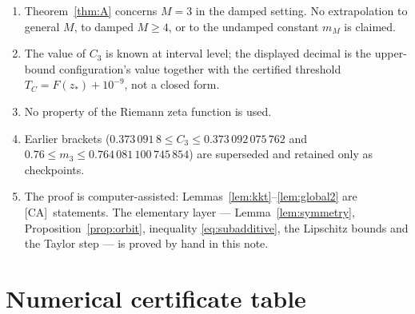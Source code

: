\documentclass[11pt]{article}
\theoremstyle{remark}
\newcommand{\CA}{\textsf{[CA]}}
\begin{document}
\begin{enumerate}
\item Theorem~\ref{thm:A} concerns $M=3$ in the damped setting. No extrapolation to general $M$, to damped
$M\ge4$, or to the undamped constant $m_M$ is claimed.
\item The value of $C_3$ is known at interval level; the displayed decimal is the upper-bound
configuration's value together with the certified threshold $T_C=F(z_*)+10^{-9}$, not a closed form.
\item No property of the Riemann zeta function is used.
\item Earlier brackets ($0.373\,091\,8\le C_3\le0.373\,092\,075\,762$ and
$0.76\le m_3\le0.764\,081\,100\,745\,854$) are superseded and retained only as checkpoints.
\item The proof is computer-assisted: Lemmas~\ref{lem:kkt}--\ref{lem:global2} are \CA\ statements. The
elementary layer --- Lemma~\ref{lem:symmetry}, Proposition~\ref{prop:orbit}, inequality
\eqref{eq:subadditive}, the Lipschitz bounds and the Taylor step --- is proved by hand in this note.
\end{enumerate}

\appendix

\section{Numerical certificate table}
\end{document}
